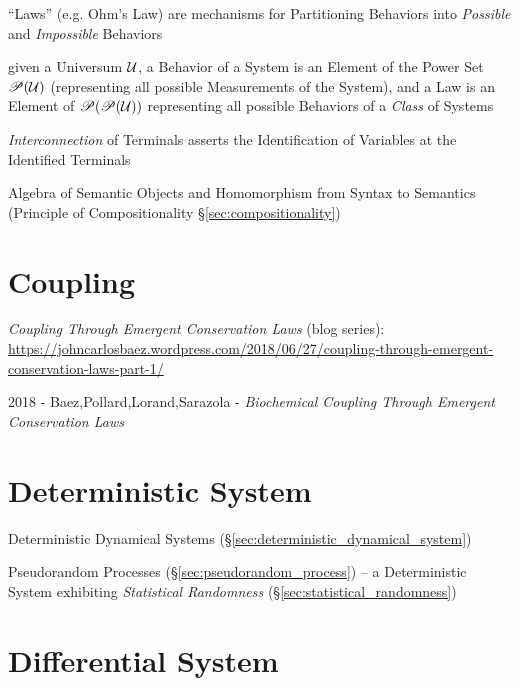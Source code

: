 
``Laws'' (e.g. Ohm's Law) are mechanisms for Partitioning Behaviors
into \emph{Possible} and \emph{Impossible} Behaviors

given a Universum $\mathcal{U}$, a Behavior of a System is an Element
of the Power Set $\mathscr{P}(\mathcal{U})$ (representing all possible
Measurements of the System), and a Law is an Element of
$\mathscr{P}(\mathscr{P}(\mathcal{U}))$ representing all possible Behaviors of a
\emph{Class} of Systems

\emph{Interconnection} of Terminals asserts the Identification of
Variables at the Identified Terminals

Algebra of Semantic Objects and Homomorphism from Syntax to Semantics
(Principle of Compositionality \S\ref{sec:compositionality})



\section{Coupling}\label{sec:coupling}

\emph{Coupling Through Emergent Conservation Laws} (blog series):
\url{https://johncarlosbaez.wordpress.com/2018/06/27/coupling-through-emergent-conservation-laws-part-1/}

2018 - Baez,Pollard,Lorand,Sarazola -
\emph{Biochemical Coupling Through Emergent Conservation Laws}



\section{Deterministic System}\label{sec:deterministic_system}

\fist Deterministic Dynamical Systems
(\S\ref{sec:deterministic_dynamical_system})

\fist Pseudorandom Processes (\S\ref{sec:pseudorandom_process}) -- a
Deterministic System exhibiting \emph{Statistical Randomness}
(\S\ref{sec:statistical_randomness})



\section{Differential System}\label{sec:differential_system}

